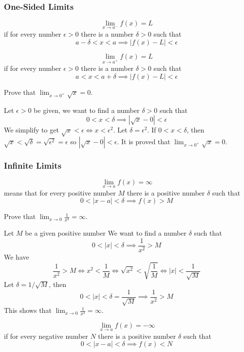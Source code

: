 \subsubsection*{One-Sided Limits}
\begin{definition}
    \[\lim_{x\to a^-}f(x)=L\]
    if for every number \(\epsilon>0\) there is a number \(\delta>0\) such
    that
    \[a-\delta<x<a\implies|f(x)-L|<\epsilon\]
\end{definition}
\begin{definition}
    \[\lim_{x\to a^+}f(x)=L\]
    if for every number \(\epsilon>0\) there is a number \(\delta>0\) such
    that
    \[a<x<a+\delta\implies|f(x)-L|<\epsilon\]
\end{definition}
\begin{problem}
    Prove that \(\displaystyle{\lim_{x\to 0^+}\sqrt{x}=0}\).
\end{problem}
\begin{solution}
    Let \(\epsilon>0\) be given, we want to find a number \(\delta>0\) such
    that
    \[0<x<\delta\implies|\sqrt{x}-0|<\epsilon\]
    We simplify to get \(\sqrt{x}<\epsilon\iff x<\epsilon^2\).
    Let \(\delta=\epsilon^2\).
    If \(0<x<\delta\), then
    \(\sqrt{x}<\sqrt{\delta}=\sqrt{\epsilon^2}=\epsilon\)
    so \(|\sqrt{x}-0|<\epsilon\).
    It is proved that \(\displaystyle{\lim_{x\to 0^+}\sqrt{x}=0}\).
\end{solution}

\subsubsection*{Infinite Limits}
\begin{definition}
    \[\lim_{x\to a}f(x)=\infty\]
    means that for every positive number \(M\) there is a positive number
    \(\delta\) such that
    \[0<|x-a|<\delta\implies f(x)>M\]
\end{definition}
\begin{problem}
    Prove that \(\displaystyle{\lim_{x\to 0}\frac{1}{x^2}=\infty}\).
\end{problem}
\begin{solution}
    Let \(M\) be a given positive number
    We want to find a number \(\delta\) such that
    \[0<|x|<\delta\implies\frac{1}{x^2}>M\]
    We have
    \[\frac{1}{x^2}>M\iff x^2<\frac{1}{M}\iff\sqrt{x^2}<\sqrt{\frac{1}{M}}
    \iff|x|<\frac{1}{\sqrt{M}}\]
    Let \(\delta=1/\sqrt{M}\), then
    \[0<|x|<\delta=\frac{1}{\sqrt{M}}\implies\frac{1}{x^2}>M\]
    This shows that
    \(\displaystyle{\lim_{x\to 0}\frac{1}{x^2}=\infty}\).
\end{solution}
\begin{definition}
    \[\lim_{x\to a}f(x)=-\infty\]
    if for every negative number \(N\) there is a positive number \(\delta\)
    such that
    \[0<|x-a|<\delta\implies f(x)<N\]
\end{definition}